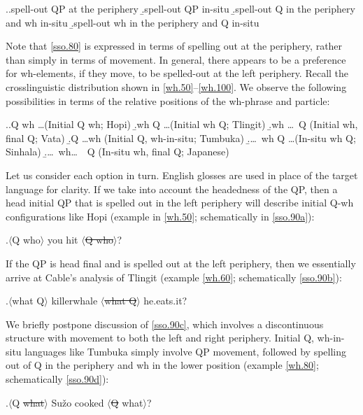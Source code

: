 \documentclass[charis]{glossa}
\begin{document}
\ex.\label{sso.80}\a.\label{sso.80a}spell-out QP at the periphery
    \b.\label{sso.80b}spell-out QP in-situ
    \b.\label{sso.80c}spell-out Q in the periphery and wh in-situ
    \b.\label{sso.80d}spell-out wh in the periphery and Q in-situ

Note that \ref{sso.80} is expressed in terms of spelling out at the periphery, rather than simply in terms of movement. In general, there appears to be a preference for wh-elements, if they move, to be spelled-out at the left periphery. Recall the crosslinguistic distribution shown in \ref{wh.50}--\ref{wh.100}. We observe the following possibilities in terms of the relative positions of the wh-phrase and particle:

\ex.\label{sso.90}\a.\label{sso.90a}Q wh \dots  (Initial Q wh; Hopi)
   \b.\label{sso.90b}wh Q \dots  (Initial wh Q; Tlingit)
   \b.\label{sso.90c}wh \dots\ Q (Initial wh, final Q; Vata)
   \b.\label{sso.90d}Q \dots wh (Initial Q, wh-in-situ; Tumbuka)
   \b.\label{sso.90e}\dots\ wh Q \dots (In-situ wh Q; Sinhala)
   \b.\label{sso.90f}\dots\ wh\dots\ \ Q (In-situ wh, final Q; Japanese)

Let us consider each option in turn. English glosses are used in place of the target language for clarity. If we take into account the headedness of the QP, then a head initial QP that is spelled out in the left periphery will describe initial Q-wh configurations like Hopi (example in \ref{wh.50}; schematically in \ref{sso.90a}):

\ex.\label{sso.91}$\langle$Q who$\rangle$ you hit $\langle$\sout{Q who}$\rangle$?

If the QP is head final and is spelled out at the left periphery, then we essentially arrive at Cable's \citeyear{cable:2007} analysis of Tlingit (example \ref{wh.60}; schematically \ref{sso.90b}):

\ex.\label{sso.92}$\langle$what Q$\rangle$ killerwhale $\langle$\sout{what Q}$\rangle$ he.eats.it?

We briefly postpone discussion of \ref{sso.90c}, which involves a discontinuous structure with movement to both the left and right periphery. Initial Q, wh-in-situ languages like Tumbuka simply involve QP movement, followed by spelling out of Q in the periphery and wh in the lower position (example \ref{wh.80}; schematically \ref{sso.90d}):

\ex.\label{sso.93}$\langle$Q \sout{what}$\rangle$ Su\v{z}o cooked $\langle$\sout{Q} what$\rangle$?
\end{document}
